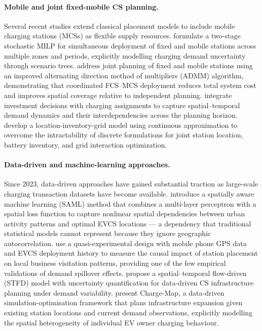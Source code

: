 \documentclass[12pt,letterpaper]{article}
\begin{document}
\paragraph{Mobile and joint fixed-mobile CS planning.}
Several recent studies extend classical placement models to include mobile
charging stations (MCSs) as flexible supply resources.  \citet{najafzad2026}
formulate a two-stage stochastic MILP for simultaneous deployment of
fixed and mobile stations across multiple zones and periods, explicitly
modelling charging demand uncertainty through scenario trees.
\citet{yu2025} address joint planning of fixed and mobile stations using
an improved alternating direction method of multipliers (ADMM) algorithm,
demonstrating that coordinated FCS--MCS deployment reduces total system
cost and improves spatial coverage relative to independent planning.
\citet{zheng2025} integrate investment decisions with charging
assignments to capture spatial--temporal demand dynamics and their
interdependencies across the planning horizon.  \citet{ai2025} develop a
location-inventory-grid model using continuous approximation to overcome
the intractability of discrete formulations for joint station location,
battery inventory, and grid interaction optimization.

\paragraph{Data-driven and machine-learning approaches.}
Since 2023, data-driven approaches have gained substantial traction as
large-scale charging transaction datasets have become available.
\citet{huang2025} introduce a spatially aware machine learning (SAML)
method that combines a multi-layer perceptron with a spatial loss
function to capture nonlinear spatial dependencies between urban activity
patterns and optimal EVCS locations --- a dependency that traditional
statistical models cannot represent because they ignore geographic
autocorrelation.  \citet{silva2025} use a quasi-experimental design
with mobile phone GPS data and EVCS deployment history to measure the
causal impact of station placement on local business visitation patterns,
providing one of the few empirical validations of demand spillover
effects.  \citet{alharbi2025} propose a spatial--temporal flow-driven
(STFD) model with uncertainty quantification for data-driven CS
infrastructure planning under demand variability.  \citet{islam2025}
present Charge-Map, a data-driven simulation-optimisation framework
that plans infrastructure expansion given existing station locations and
current demand observations, explicitly modelling the spatial
heterogeneity of individual EV owner charging behaviour.
\end{document}
